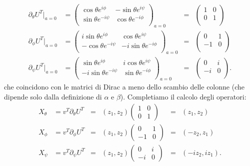 \documentclass[fleqn,italian]{article}
\theoremstyle{definition}
\theoremstyle{remark}
\theoremstyle{plain}%
\theoremstyle{definition}
\theoremstyle{remark}
\numberwithin{equation}{section}
\numberwithin{thm}{section}
\begin{document}
\begin{equation}
\begin{split}
\partial_\theta U^T|_{a=0} & =
        \begin{pmatrix} \cos\theta e^{i\phi} & -\sin\theta e^{i\psi} \\
                  \sin\theta e^{-i\psi} & \cos\theta e^{-i\phi} \\
        \end{pmatrix}_{a=0} & = &
        \begin{pmatrix} 1 & 0 \\ 0 & 1 \\ \end{pmatrix} \\
\partial_\phi U^T|_{a=0} & =
        \begin{pmatrix} i\sin\theta e^{i\phi} & \cos\theta e^{i\psi} \\
                  -\cos\theta e^{-i\psi} & -i\sin\theta e^{-i\phi} \\
        \end{pmatrix}_{a=0} & = &
        \begin{pmatrix} 0 & 1 \\ -1 & 0 \\ \end{pmatrix} \\
\partial_\psi U^T|_{a=0} & =
        \begin{pmatrix} \sin\theta e^{i\phi} & i\cos\theta e^{i\psi} \\
                  -i\sin\theta e^{-i\psi} & \sin\theta e^{-i\phi} \\
        \end{pmatrix}_{a=0} & = &
        \begin{pmatrix} 0 & i \\ -i & 0 \\ \end{pmatrix} .
\end{split}
\end{equation}
che coincidono con le matrici di Dirac a meno dello scambio delle colonne
(che dipende solo dalla definizione di $\alpha$ e $\beta$).
Completiamo il calcolo degli operatori:
\begin{equation}
\begin{split}
X_\theta & = v^T\partial_\theta U^T & = & (z_1,z_2)
    \begin{pmatrix} 1 & 0 \\ 0 & 1 \end{pmatrix} & = & (z_1,z_2) \\
X_\phi & = v^T\partial_\phi U^T & = & (z_1,z_2)
    \begin{pmatrix} 0 & 1 \\ -1 & 0 \end{pmatrix} & = & (-z_2,z_1) \\
X_\psi & = v^T\partial_\psi U^T & = & (z_1,z_2)
    \begin{pmatrix} 0 & i \\ -i & 0 \end{pmatrix} & = & (-iz_2,iz_1) .
\end{split}
\end{equation}
\end{document}
